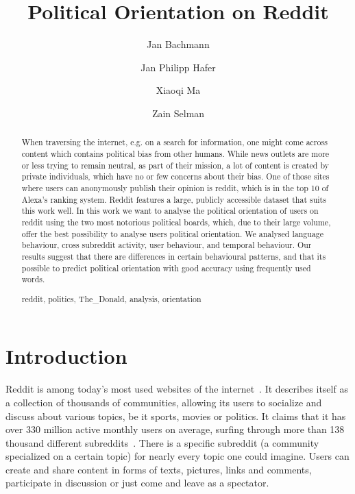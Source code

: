 \documentclass[runningheads,a4paper]{llncs}
\newcommand{\keywords}[1]{\par\addvspace\baselineskip
	\noindent\keywordname\enspace\ignorespaces#1}
\begin{document}
	
	\mainmatter  %
	
	\title{Political Orientation on Reddit}
	
	
	\author{Jan Bachmann\and Jan Philipp Hafer\and Xiaoqi Ma\and Zain Selman}
	\maketitle
	
	
	\begin{abstract}
		When traversing the internet, e.g. on a search for information, one might come across content which contains political bias from other humans. While news outlets are more or less trying to remain neutral, as part of their mission, a lot of content is created by private individuals, which have no or few concerns about their bias. One of those sites where users can anonymously publish their opinion is reddit, which is in the top 10 of Alexa's ranking system. Reddit features a large, publicly accessible dataset that suits this work well. In this work we want to analyse the political orientation of users on reddit using the two most notorious political boards, which, due to their large volume, offer the best possibility to analyse users political orientation. We analysed language behaviour, cross subreddit activity, user behaviour, and temporal behaviour. Our results suggest that there are differences in certain behavioural patterns, and that its possible to predict political orientation with good accuracy using frequently used words.
		\keywords{reddit, politics, The\_Donald, analysis, orientation}
	\end{abstract}
	
	\section{Introduction}
	
	Reddit is among today's most used websites of the internet~\cite{reddit-traffic-stats}. It describes
	itself as a collection of thousands of communities, allowing its users to socialize and discuss
	about various topics, be it sports, movies or politics. It claims that it has over 330 million active monthly users on average, surfing through more than 138 thousand different subreddits~\cite{reddit-about}. There is a specific subreddit (a community specialized on a certain topic) for nearly every topic one could imagine. Users can create and share content in forms of texts, pictures, links and comments, participate in discussion or just come and leave as a spectator.
	
\end{document}
